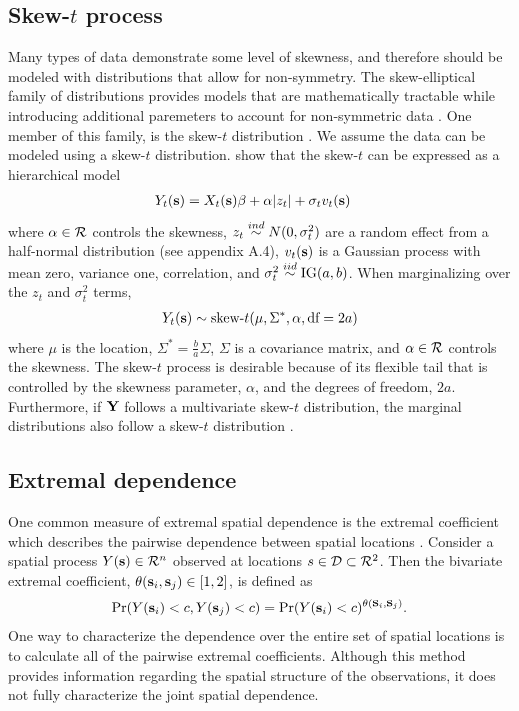\documentclass[11pt]{article}
\begin{document}
\subsection{Skew-$t$ process}\label{s:data}
Many types of data demonstrate some level of skewness, and therefore should be modeled with distributions that allow for non-symmetry.
The skew-elliptical family of distributions provides models that are mathematically tractable while introducing additional paremeters to account for non-symmetric data \citep{Genton2004}.
One member of this family, is the skew-$t$ distribution \citep{Azzalini2003}.
We assume the data can be modeled using a skew-$t$ distribution.
\citet{Zhang2010} show that the skew-$t$ can be expressed as a hierarchical model
\begin{align} \label{eq:fullmodel}
  Y_t(\mbox{\bf s}) &= X_t(\mbox{\bf s}) \beta + \alpha |z_t| + \sigma_t v_t(\mbox{\bf s})
\end{align}
where $\alpha \in {\cal R}$ controls the skewness, $z_{t} \stackrel{ind}{\sim} N(0, \sigma^2_t)$ are a random effect from a half-normal distribution (see appendix A.4), $v_t(\mbox{\bf s})$ is a Gaussian process with mean zero, variance one, \Matern correlation, and $\sigma^2_t \stackrel{iid}{\sim} \text{IG}(a, b)$.
When marginalizing over the $z_t$ and $\sigma^2_t$ terms,
\begin{align*}
  Y_t(\mbox{\bf s}) \sim \text{skew-}t (\mu, \Sigma^*, \alpha, \text{df} = 2a)
\end{align*}
where $\mu$ is the location, $\Sigma^* = \frac{ b }{ a } \Sigma$, $\Sigma$ is a \Matern covariance matrix, and $\alpha \in {\cal R}$ controls the skewness.
The skew-$t$ process is desirable because of its flexible tail that is controlled by the skewness parameter, $\alpha$, and the degrees of freedom, $2a$.
Furthermore, if $\mbox{\bf Y}$ follows a multivariate skew-$t$ distribution, the marginal distributions also follow a skew-$t$ distribution \citep{Azzalini2003}.

\subsection{Extremal dependence}
One common measure of extremal spatial dependence is the extremal coefficient which describes the pairwise dependence between spatial locations \citep{Smith1990}.
Consider a spatial process $Y(\mbox{\bf s}) \in {\cal R}^n$ observed at locations $s \in {\cal D} \subset {\cal R}^2$.
Then the bivariate extremal coefficient, $\theta(\mbox{\bf s}_i, \mbox{\bf s}_j) \in [1, 2]$, is defined as
\begin{align}
  \Pr(Y(\mbox{\bf s}_i) < c, Y(\mbox{\bf s}_j) < c) = \Pr(Y(\mbox{\bf s}_i) < c)^{\theta(\mbox{\bf s}_i, \mbox{\bf s}_j) }. \label{eq:extremalcoef}
\end{align}
One way to characterize the dependence over the entire set of spatial locations is to calculate all of the pairwise extremal coefficients.
Although this method provides information regarding the spatial structure of the observations, it does not fully characterize the joint spatial dependence.
\end{document}
